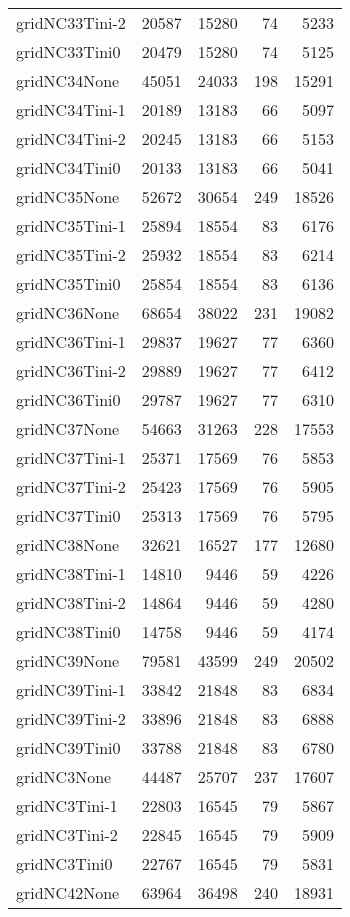 \begin{longtable}{lrrrr}
gridNC33Tini-2 & 20587 & 15280 & 74 & 5233 \\
gridNC33Tini0 & 20479 & 15280 & 74 & 5125 \\
gridNC34None & 45051 & 24033 & 198 & 15291 \\
gridNC34Tini-1 & 20189 & 13183 & 66 & 5097 \\
gridNC34Tini-2 & 20245 & 13183 & 66 & 5153 \\
gridNC34Tini0 & 20133 & 13183 & 66 & 5041 \\
gridNC35None & 52672 & 30654 & 249 & 18526 \\
gridNC35Tini-1 & 25894 & 18554 & 83 & 6176 \\
gridNC35Tini-2 & 25932 & 18554 & 83 & 6214 \\
gridNC35Tini0 & 25854 & 18554 & 83 & 6136 \\
gridNC36None & 68654 & 38022 & 231 & 19082 \\
gridNC36Tini-1 & 29837 & 19627 & 77 & 6360 \\
gridNC36Tini-2 & 29889 & 19627 & 77 & 6412 \\
gridNC36Tini0 & 29787 & 19627 & 77 & 6310 \\
gridNC37None & 54663 & 31263 & 228 & 17553 \\
gridNC37Tini-1 & 25371 & 17569 & 76 & 5853 \\
gridNC37Tini-2 & 25423 & 17569 & 76 & 5905 \\
gridNC37Tini0 & 25313 & 17569 & 76 & 5795 \\
gridNC38None & 32621 & 16527 & 177 & 12680 \\
gridNC38Tini-1 & 14810 & 9446 & 59 & 4226 \\
gridNC38Tini-2 & 14864 & 9446 & 59 & 4280 \\
gridNC38Tini0 & 14758 & 9446 & 59 & 4174 \\
gridNC39None & 79581 & 43599 & 249 & 20502 \\
gridNC39Tini-1 & 33842 & 21848 & 83 & 6834 \\
gridNC39Tini-2 & 33896 & 21848 & 83 & 6888 \\
gridNC39Tini0 & 33788 & 21848 & 83 & 6780 \\
gridNC3None & 44487 & 25707 & 237 & 17607 \\
gridNC3Tini-1 & 22803 & 16545 & 79 & 5867 \\
gridNC3Tini-2 & 22845 & 16545 & 79 & 5909 \\
gridNC3Tini0 & 22767 & 16545 & 79 & 5831 \\
gridNC42None & 63964 & 36498 & 240 & 18931 \\

\end{longtable}
